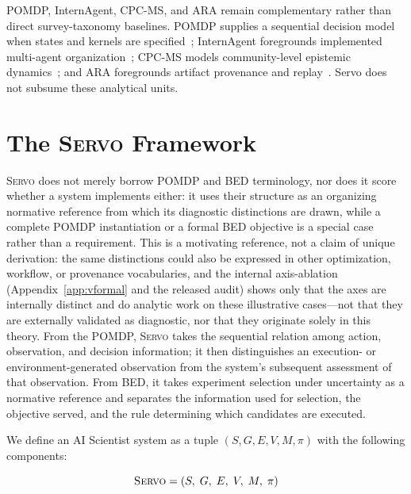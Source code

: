 \documentclass{article}
\newcommand{\sgmvpi}{$(S, G, E, V, M, \pi)$}
\newcommand{\framework}{\textsc{Servo}}
\begin{document}
POMDP, InternAgent, CPC-MS, and ARA remain complementary rather than direct survey-taxonomy baselines. POMDP supplies a sequential decision model when states and kernels are specified~\citep{kaelbling1998pomdp}; InternAgent foregrounds implemented multi-agent organization~\citep{zhang2025novelseek}; CPC-MS models community-level epistemic dynamics~\citep{taniguchi2024cpc}; and ARA foregrounds artifact provenance and replay~\citep{liu2026lasthuman}. Servo does not subsume these analytical units.

\section{The \framework{} Framework}
\label{sec:framework}

\framework{} does not merely borrow POMDP and BED terminology, nor does it score whether a system implements either: it uses their structure as an organizing normative reference from which its diagnostic distinctions are drawn, while a complete POMDP instantiation or a formal BED objective is a special case rather than a requirement. This is a motivating reference, not a claim of unique derivation: the same distinctions could also be expressed in other optimization, workflow, or provenance vocabularies, and the internal axis-ablation (Appendix~\ref{app:vformal} and the released audit) shows only that the axes are internally distinct and do analytic work on these illustrative cases---not that they are externally validated as diagnostic, nor that they originate solely in this theory. From the POMDP, \framework{} takes the sequential relation among action, observation, and decision information; it then distinguishes an execution- or environment-generated observation from the system's subsequent assessment of that observation. From BED, it takes experiment selection under uncertainty as a normative reference and separates the information used for selection, the objective served, and the rule determining which candidates are executed.

We define an AI Scientist system as a tuple \sgmvpi{} with the following components:

\begin{equation}
  \text{\framework{}} = (S,\; G,\; E,\; V,\; M,\; \pi)
\end{equation}
\end{document}
